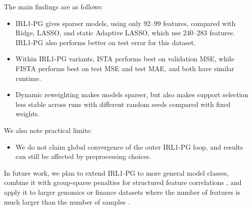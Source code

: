 \documentclass[12pt,a4paper]{article}
\begin{document}
The main findings are as follows:
\begin{itemize}[noitemsep]
    \item IRL1-PG gives sparser models, using only 92--99 features, compared with Ridge,
        LASSO, and static Adaptive LASSO, which use 240--283 features. IRL1-PG also
        performs better on test error for this dataset.
    \item Within IRL1-PG variants, ISTA performs best on validation MSE, while FISTA
        performs best on test MSE and test MAE, and both have similar runtime.
    \item Dynamic reweighting makes models sparser, but also makes support selection less
        stable across runs with different random seeds compared with fixed weights.
\end{itemize}

We also note practical limits:
\begin{itemize}[noitemsep]
    \item We do not claim global convergence of the outer IRL1-PG loop, and results can
        still be affected by preprocessing choices.
\end{itemize}

In future work, we plan to extend IRL1-PG to more general model classes, combine it with
group-sparse penalties for structured feature correlations \citep{zouhastie2005}, and apply
it to larger genomics or finance datasets where the number of features is much larger than
the number of samples \citep{huang2008}.
\end{document}
